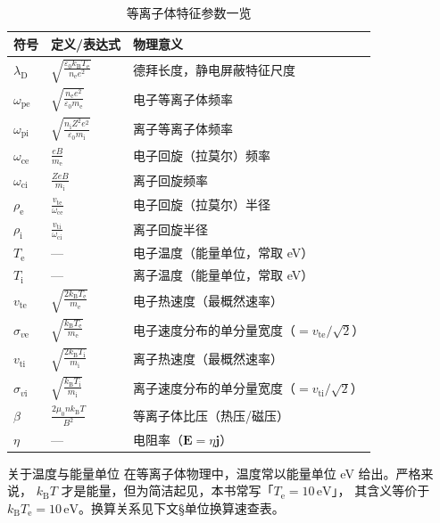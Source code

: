 \documentclass[12pt,a4paper,openany,oneside]{book}
\newcommand{\ii}{\mathrm{i}}
\newcommand{\ee}{\mathrm{e}}
\newcommand{\eps}{\varepsilon}
\newcommand{\vect}[1]{\bm{#1}}
\begin{document}
\begin{table}[htbp]
\centering
\caption{等离子体特征参数一览}
\begin{tabular}{@{}llp{6.5cm}@{}}
\toprule
\textbf{符号} & \textbf{定义/表达式} & \textbf{物理意义} \\
\midrule
$\lambda_\mathrm{D}$ & $\displaystyle\sqrt{\frac{\eps_0 k_\mathrm{B} T_\ee}{n_\ee e^2}}$ & 德拜长度，静电屏蔽特征尺度 \\
$\omega_{\mathrm{p}\ee}$ & $\displaystyle\sqrt{\frac{n_\ee e^2}{\eps_0 m_\ee}}$ & 电子等离子体频率 \\
$\omega_{\mathrm{p}\ii}$ & $\displaystyle\sqrt{\frac{n_\ii Z^2 e^2}{\eps_0 m_\ii}}$ & 离子等离子体频率 \\
$\omega_{\mathrm{c}\ee}$ & $\displaystyle\frac{e B}{m_\ee}$ & 电子回旋（拉莫尔）频率 \\
$\omega_{\mathrm{c}\ii}$ & $\displaystyle\frac{Z e B}{m_\ii}$ & 离子回旋频率 \\
$\rho_\ee$ & $\displaystyle\frac{v_{\mathrm{t}\ee}}{\omega_{\mathrm{c}\ee}}$ & 电子回旋（拉莫尔）半径 \\
$\rho_\ii$ & $\displaystyle\frac{v_{\mathrm{t}\ii}}{\omega_{\mathrm{c}\ii}}$ & 离子回旋半径 \\
$T_\ee$ & — & 电子温度（能量单位，常取 eV） \\
$T_\ii$ & — & 离子温度（能量单位，常取 eV） \\
$v_{\mathrm{t}\ee}$ & $\displaystyle\sqrt{\frac{2k_\mathrm{B} T_\ee}{m_\ee}}$ & 电子热速度（最概然速率） \\
$\sigma_{v\ee}$ & $\displaystyle\sqrt{\frac{k_\mathrm{B} T_\ee}{m_\ee}}$ & 电子速度分布的单分量宽度（$=v_{\mathrm{t}\ee}/\sqrt2$） \\
$v_{\mathrm{t}\ii}$ & $\displaystyle\sqrt{\frac{2k_\mathrm{B} T_\ii}{m_\ii}}$ & 离子热速度（最概然速率） \\
$\sigma_{v\ii}$ & $\displaystyle\sqrt{\frac{k_\mathrm{B} T_\ii}{m_\ii}}$ & 离子速度分布的单分量宽度（$=v_{\mathrm{t}\ii}/\sqrt2$） \\
$\beta$ & $\displaystyle\frac{2\mu_0 n k_\mathrm{B} T}{B^2}$ & 等离子体比压（热压/磁压） \\
$\eta$ & — & 电阻率（$\vect{E}=\eta\vect{j}$） \\
\bottomrule
\end{tabular}
\end{table}

\begin{insight}{关于温度与能量单位}{}
在等离子体物理中，温度常以能量单位 eV 给出。严格来说，
$k_\mathrm{B} T$ 才是能量，但为简洁起见，本书常写「$T_\ee=10\,\mathrm{eV}$」，
其含义等价于 $k_\mathrm{B} T_\ee=10\,\mathrm{eV}$。换算关系见下文\S 单位换算速查表。
\end{insight}
\end{document}
